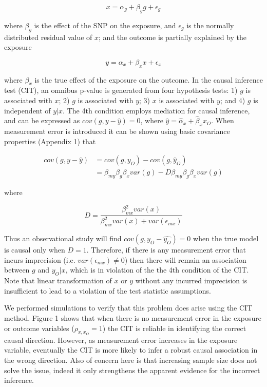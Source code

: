 \documentclass[]{article}
\begin{document}
\[
x = \alpha_g + \beta_g g + \epsilon_g
\]

where \(\beta_g\) is the effect of the SNP on the exposure, and
\(\epsilon_g\) is the normally distributed residual value of \(x\); and
the outcome is partially explained by the exposure

\[
y = \alpha_x + \beta_x x + \epsilon_x
\]

where \(\beta_x\) is the true effect of the exposure on the outcome. In
the causal inference test (CIT), an omnibus p-value is generated from
four hypothesis tests: 1) \(g\) is associated with \(x\); 2) \(g\) is
associated with \(y\); 3) \(x\) is associated with \(y\); and 4) \(g\)
is independent of \(y|x\). The 4th condition employs mediation for
causal inference, and can be expressed as \(cov(g, y - \hat{y}) = 0\),
where \(\hat{y} = \hat{\alpha}_x + \hat{\beta}_x x_O\). When measurement
error is introduced it can be shown using basic covariance properties
(Appendix 1) that

\[
\begin{aligned}
cov(g, y - \hat{y}) & = cov(g, y_O) - cov(g, \hat{y}_O)  \\
                    & = \beta_{my} \beta_g \beta_x var(g) - D \beta_{my} \beta_g \beta_x var(g)
\end{aligned}
\]

where

\[
D = \frac{\beta^2_{mx} var(x)} {\beta^2_{mx} var(x) + var(\epsilon_{mx})}
\]

Thus an observational study will find \(cov(g, y_O - \hat{y_O}) = 0\)
when the true model is causal only when \(D = 1\). Therefore, if there
is any measurement error that incurs imprecision (i.e.
\(var(\epsilon_{mx}) \neq 0\)) then there will remain an association
between \(g\) and \(y_O | x\), which is in violation of the the 4th
condition of the CIT. Note that linear transformation of \(x\) or \(y\)
without any incurred imprecision is insufficient to lead to a violation
of the test statistic assumptions.

We performed simulations to verify that this problem does arise using
the CIT method. Figure 1 shows that when there is no measurement error
in the exposure or outcome variables (\(\rho_{x, x_O}=1\)) the CIT is
reliable in identifying the correct causal direction. However, as
measurement error increases in the exposure variable, eventually the CIT
is more likely to infer a robust causal association in the wrong
direction. Also of concern here is that increasing sample size does not
solve the issue, indeed it only strengthens the apparent evidence for
the incorrect inference.
\end{document}
